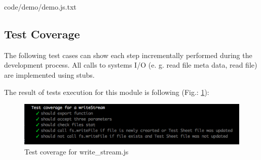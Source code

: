 {
{code/demo/demo.js.txt}

%

\subsection{Test Coverage}
The following test cases can show each step incrementally performed during the development process. All calls to systems I/O (e. g. read file meta data, read file) are implemented using stubs.
%


The result of tests execution  for this module is following (Fig.: \ref{fig:testWrite}): 
\begin{figure}[H]
	\centering
	\includegraphics[width=\linewidth]{grafiken/testWriteStream.png}
	\caption{Test coverage for write\_stream.js}
	\label{fig:testWrite}
\end{figure}

}
